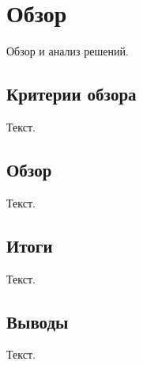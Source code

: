 \chapter{Обзор}

Обзор и анализ решений.

\section{Критерии обзора}

Текст.

\section{Обзор}

Текст.

\section{Итоги}

Текст.

\section{Выводы}

Текст.
